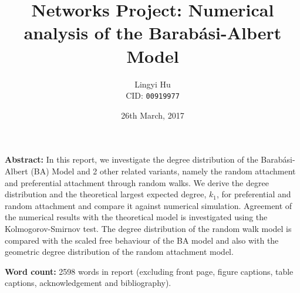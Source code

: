 


\title{Networks Project: Numerical analysis of the Barab\'asi-Albert Model}
\date{26th March, 2017}
\author{Lingyi Hu\\ CID: \texttt{00919977}}
\maketitle

\vspace*{2cm}
\noindent
{\bf Abstract:} In this report, we investigate the degree distribution of the Barab\'asi-Albert (BA) Model and 2 other related variants, namely the random attachment and preferential attachment through random walks. We derive the degree distribution and the theoretical largest expected degree, $k_1$, for preferential and random attachment and compare it against numerical simulation. Agreement of the numerical results with the theoretical model is investigated using the Kolmogorov-Smirnov test. The degree distribution of the random walk model is compared with the scaled free behaviour of the BA model and also with the geometric degree distribution of the random attachment model. 


\vspace*{2cm}
\noindent
{\bf Word count:}
2598 words in report (excluding front page, figure captions, table captions, acknowledgement and bibliography).


\newpage







\newpage
\noindent
\vspace*{2cm}

\printbibliography[heading=bibintoc]


